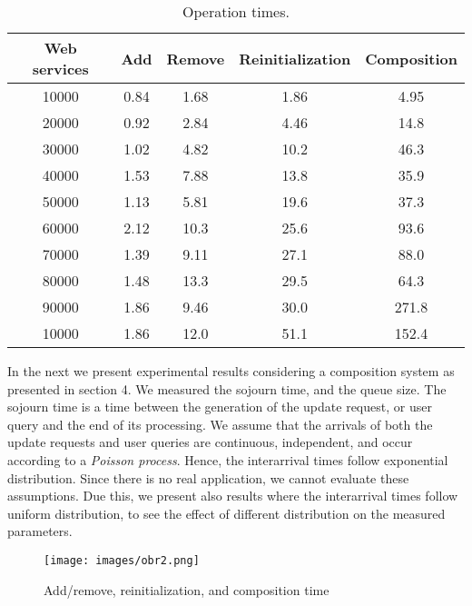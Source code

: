 \documentclass[10pt]{llncs}
\begin{document}
\begin{table}
\centering
\caption{Operation times.}
\label{my-label}
\begin{tabular}{|c|c|c|c|c|}
\hline
\textbf{Web services} & \textbf{Add}  & \textbf{Remove} & \textbf{Reinitialization} & \textbf{Composition} \\ \hline
										\hline
10000        & 0.84 & 1.68   & 1.86             & 4.95        \\ \hline
20000        & 0.92 & 2.84   & 4.46             & 14.8        \\ \hline
30000        & 1.02 & 4.82   & 10.2             & 46.3        \\ \hline
40000        & 1.53 & 7.88   & 13.8             & 35.9        \\ \hline
50000        & 1.13 & 5.81   & 19.6             & 37.3        \\ \hline
60000        & 2.12 & 10.3   & 25.6             & 93.6        \\ \hline
70000        & 1.39 & 9.11   & 27.1             & 88.0        \\ \hline
80000        & 1.48 & 13.3   & 29.5             & 64.3        \\ \hline
90000        & 1.86 & 9.46   & 30.0             & 271.8       \\ \hline
10000        & 1.86 & 12.0   & 51.1             & 152.4       \\ \hline
\end{tabular}
\end{table}


In the next we present experimental results considering a composition system as presented in section 4. We measured the sojourn time, and the queue size. The sojourn time is a time between the generation of the update request, or user query and the end of its processing. We assume that the arrivals of both the update requests and user queries are continuous, independent, and occur according to a \textit{Poisson process}. Hence, the interarrival times follow exponential distribution. Since there is no real application, we cannot evaluate these assumptions. Due this, we present also results where the interarrival times follow uniform distribution, to see the effect of different distribution on the measured parameters.


\begin{figure}[h]
\texttt{[image: images/obr2.png]}
\caption{Add/remove, reinitialization, and composition time}
\end{figure}
\end{document}

